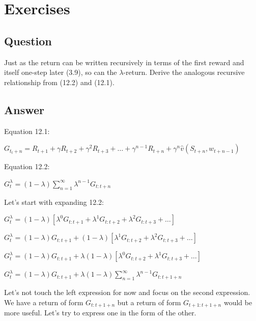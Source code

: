 \documentclass[11pt]{article}
\begin{document}
    \maketitle
    \setcounter{section}{11}


    \section{Exercises}

    \subsection{Question}

    Just as the return can be written recursively in terms of the first reward and itself one-step later (3.9), so can the $\lambda$-return.
    Derive the analogous recursive relationship from (12.2) and (12.1).

    \subsection*{Answer}

    \noindent Equation 12.1:

    \noindent $ G_{t_t+n} = R_{t+1} + \gamma R_{t+2}+ \gamma^2 R_{t+3} + \ldots + \gamma^{n-1} R_{t+n} + \gamma^n \hat{v}(S_{t+n}, w_{t+n-1}) $

    \noindent Equation 12.2:

    \noindent $ G_{t}^\lambda = (1-\lambda) \sum_{n=1}^{\infty} \lambda^{n-1} G_{t:t+n} $

    \hfill \break
    \noindent Let's start with expanding 12.2:

    \noindent $ G_{t}^\lambda = (1-\lambda) [ \lambda^{0} G_{t:t+1} + \lambda^{1} G_{t:t+2} + \lambda^{2} G_{t:t+3} + \ldots ] $

    \noindent $ G_{t}^\lambda = (1-\lambda) G_{t:t+1} + (1-\lambda) [ \lambda^{1} G_{t:t+2} + \lambda^{2} G_{t:t+3} + \ldots ] $

    \noindent $ G_{t}^\lambda = (1-\lambda) G_{t:t+1} +  \lambda (1-\lambda)  [ \lambda^{0} G_{t:t+2} + \lambda^{1} G_{t:t+3} + \ldots ] $

    \noindent $ G_{t}^\lambda = (1-\lambda) G_{t:t+1} +  \lambda (1-\lambda) \sum_{n=1}^{\infty} \lambda^{n-1} G_{t:t+1+n} $

    \hfill \break
    \noindent Let's not touch the left expression for now and focus on the second expression.
    We have a return of form $ G_{t:t+1+n} $ but a return of form $ G_{t+1:t+1+n} $ would be more useful.
    Let's try to express one in the form of the other.
\end{document}
